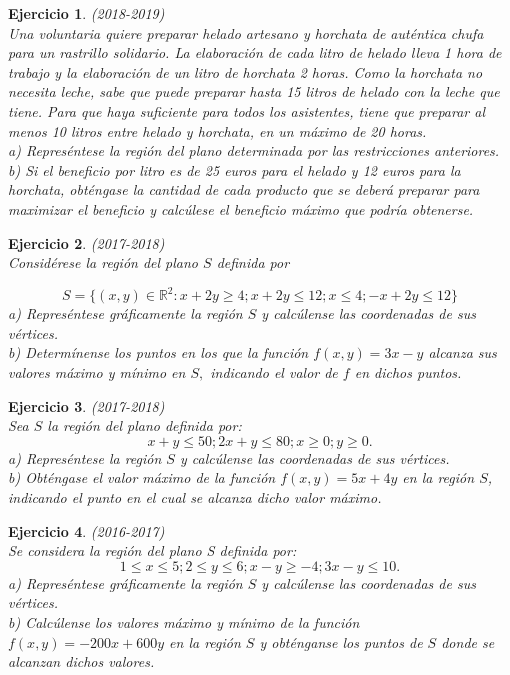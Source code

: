 \documentclass[12pt, a4paper]{amsart}
\newtheorem{ejer}{Ejercicio}
\begin{document}
\begin{ejer}\em (2018-2019)\\
Una voluntaria quiere preparar helado artesano y horchata de auténtica chufa para un rastrillo solidario. La elaboración de cada litro de helado lleva 1 hora de trabajo y la elaboración de un litro de horchata 2 horas. Como la horchata no necesita leche, sabe que puede preparar hasta 15 litros de helado con la leche que tiene. Para que haya suficiente para todos los asistentes, tiene que preparar al menos 10 litros entre helado y horchata, en un máximo de 20 horas.\\
a) Represéntese la región del plano determinada por las restricciones anteriores.\\
b) Si el beneficio por litro es de 25 euros para el helado y 12 euros para la horchata, obténgase la cantidad de cada producto que se deberá preparar para maximizar el beneficio y calcúlese el beneficio máximo que podría obtenerse.
\end{ejer}

\newpage

\begin{ejer}\em (2017-2018)\\
Considérese la región del plano $S$ definida por

\[
S=\{(x,y)\in \mathbb{R}^2: x+2y\geq 4; x+2y\leq 12; x\leq 4; -x+2y\leq 12\}
\]
a) Represéntese gráficamente la región $S$ y calcúlense las coordenadas de sus vértices.\\
b) Determínense los puntos en los que la función $f(x,y)= 3x - y$ alcanza sus valores máximo y mínimo en $S,$ indicando el valor de $f$ en dichos puntos.

\end{ejer}

\begin{ejer}\em (2017-2018)\\
Sea $S$ la región del plano definida por:
\[
x+y\leq 50 ; 2x+y\leq 80 ; x\geq 0 ; y\geq 0.
\]
a) Represéntese la región $S$ y calcúlense las coordenadas de sus vértices.\\
b) Obténgase el valor máximo de la función $f (x, y ) = 5x + 4y$ en la región $S$, indicando el punto en el cual se alcanza dicho valor máximo.
\end{ejer}

\begin{ejer}\em (2016-2017)\\
Se considera la región del plano S definida por:\\
\[
1\leq x\leq 5 ; 2\leq y \leq 6 ; x-y\geq -4 ; 3x-y\leq 10.
\]
a) Represéntese gráficamente la región $S$ y calcúlense las coordenadas de sus vértices.\\
b) Calcúlense los valores máximo y mínimo de la función $f (x, y) = - 200x + 600y$ en la región $S$ y obténganse los puntos de $S$ donde se alcanzan dichos valores.
\end{ejer}
\end{document}

